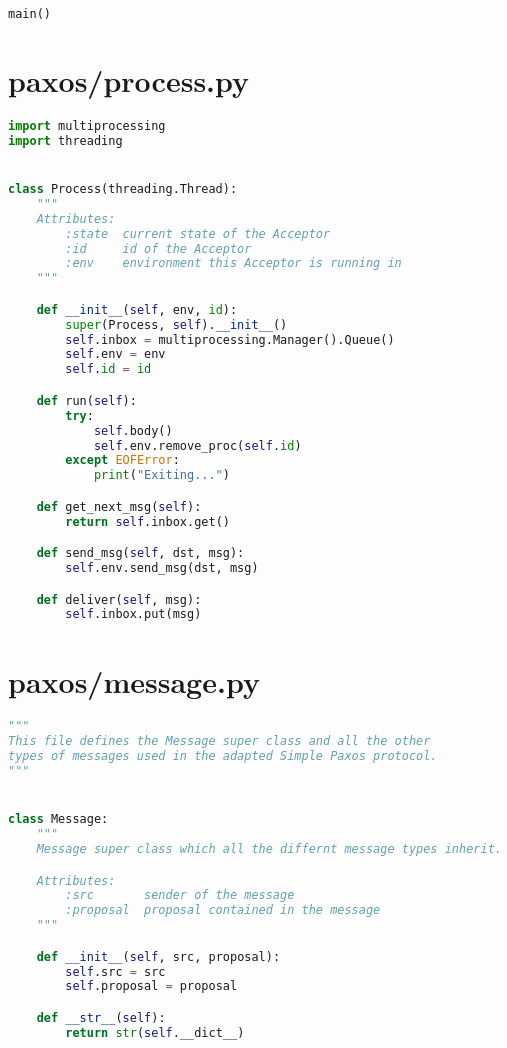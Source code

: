 \begin{landscape}
\begin{multicols*}{2}
\begin{lstlisting}[language=Python]
main()
\end{lstlisting}

\newpage

\vspace{1cm}
\section{paxos/process.py}
\begin{lstlisting}[language=Python]
import multiprocessing
import threading


class Process(threading.Thread):
    """
    Attributes:
        :state  current state of the Acceptor
        :id     id of the Acceptor
        :env    environment this Acceptor is running in
    """

    def __init__(self, env, id):
        super(Process, self).__init__()
        self.inbox = multiprocessing.Manager().Queue()
        self.env = env
        self.id = id

    def run(self):
        try:
            self.body()
            self.env.remove_proc(self.id)
        except EOFError:
            print("Exiting...")

    def get_next_msg(self):
        return self.inbox.get()

    def send_msg(self, dst, msg):
        self.env.send_msg(dst, msg)

    def deliver(self, msg):
        self.inbox.put(msg)
\end{lstlisting}

\newpage

\vspace{1cm}
\section{paxos/message.py}
\begin{lstlisting}[language=Python]
"""
This file defines the Message super class and all the other
types of messages used in the adapted Simple Paxos protocol.
"""


class Message:
    """
    Message super class which all the differnt message types inherit.

    Attributes:
        :src       sender of the message
        :proposal  proposal contained in the message
    """

    def __init__(self, src, proposal):
        self.src = src
        self.proposal = proposal

    def __str__(self):
        return str(self.__dict__)



\end{lstlisting}
\end{multicols*}
\end{landscape}
